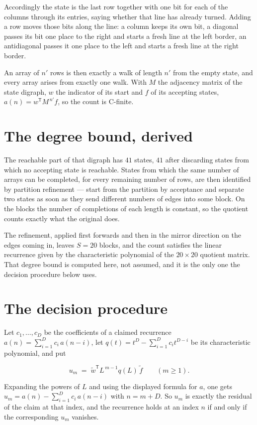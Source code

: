 \documentclass[11pt]{article}
\theoremstyle{definition}
\begin{document}
Accordingly the state is the last row together with one bit for each of the columns through its entries, saying whether that line has already turned. Adding a row moves those bits along the line: a column keeps its own bit, a diagonal passes its bit one place to the right and starts a fresh line at the left border, an antidiagonal passes it one place to the left and starts a fresh line at the right border.

An array of $n'$ rows is then exactly a walk of length $n'$ from the empty state, and every array arises from exactly one walk. With $M$ the adjacency matrix of the state digraph, $w$ the indicator of its start and $f$ of its accepting states, $a(n) = w^{\mathsf T}M^{\,n'}f$, so the count is C-finite.

\section{The degree bound, derived}

The reachable part of that digraph has $41$ states, $41$ after discarding states from which no accepting state is reachable. States from which the same number of arrays can be completed, for every remaining number of rows, are then identified by partition refinement --- start from the partition by acceptance and separate two states as soon as they send different numbers of edges into some block. On the blocks the number of completions of each length is constant, so the quotient counts exactly what the original does.

The refinement, applied first forwards and then in the mirror direction on the edges coming in, leaves $S = 20$ blocks, and the count satisfies the linear recurrence given by the characteristic polynomial of the $20 \times 20$ quotient matrix. That degree bound is computed here, not assumed, and it is the only one the decision procedure below uses.

\section{The decision procedure}

Let $c_1,\dots,c_D$ be the coefficients of a claimed recurrence $a(n) = \sum_{i=1}^{D} c_i\,a(n-i)$, let $q(t) = t^{D} - \sum_{i=1}^{D} c_i t^{D-i}$ be its characteristic polynomial, and put

\[u_m \;=\; \tilde w^{\mathsf T} L^{\,m-1} q(L)\,\tilde f \qquad (m \ge 1).\]

Expanding the powers of $L$ and using the displayed formula for $a$, one gets $u_m = a(n) - \sum_{i=1}^{D} c_i\,a(n-i)$ with $n = m + D$. So $u_m$ is exactly the residual of the claim at that index, and the recurrence holds at an index $n$ if and only if the corresponding $u_m$ vanishes.
\end{document}
